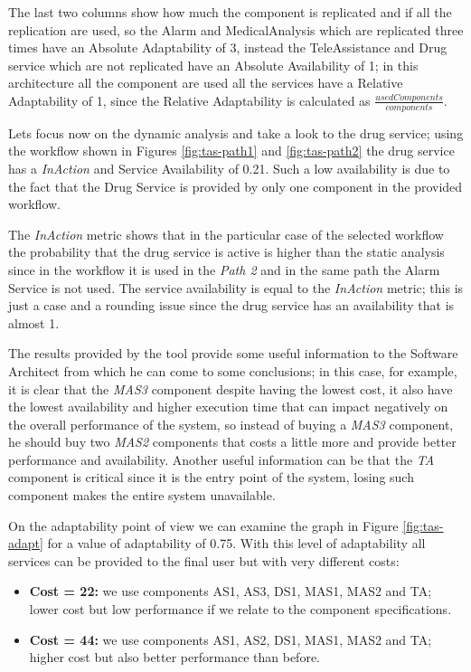 The last two columns show how much the component is replicated and if all the replication are used, so the Alarm and MedicalAnalysis which are replicated three times have an Absolute Adaptability of 3, instead the TeleAssistance and Drug service which are not replicated have an Absolute Availability of 1; in this architecture all the component are used all the services have a Relative Adaptability of 1, since the Relative Adaptability is calculated as $\frac{usedComponents}{components}$.

Lets focus now on the dynamic analysis and take a look to the drug service; using the workflow shown in Figures \ref{fig:tas-path1} and \ref{fig:tas-path2} the drug service has a \emph{InAction} and Service Availability of 0.21. Such a low availability is due to the fact that the Drug Service is provided by only one component in the provided workflow.

The \emph{InAction} metric shows that in the particular case of the selected workflow the probability that the drug service is active is higher than the static analysis since in the workflow it is used in the \emph{Path 2} and in the same path the Alarm Service is not used. The service availability is equal to the \emph{InAction} metric; this is just a case and a rounding issue since the drug service has an availability that is almost 1.

The results provided by the tool provide some useful information to the Software Architect from which he can come to some conclusions; in this case, for example, it is clear that the \emph{MAS3} component despite having the lowest cost, it also have the lowest availability and higher execution time that can impact negatively on the overall performance of the system, so instead of buying a \emph{MAS3} component, he should buy two \emph{MAS2} components that costs a little more and provide better performance and availability. Another useful information can be that the \emph{TA} component is critical since it is the entry point of the system, losing such component makes the entire system unavailable.

On the adaptability point of view we can examine the graph in Figure \ref{fig:tas-adapt} for a value of adaptability of 0.75. With this level of adaptability all services can be provided to the final user but with very different costs:
\begin{itemize}
	\item \textbf{Cost = 22:} we use components AS1, AS3, DS1, MAS1, MAS2 and TA; lower cost but low performance if we relate to the component specifications.
	\item \textbf{Cost = 44:} we use components AS1, AS2, DS1, MAS1, MAS2 and TA; higher cost but also better performance than before.
\end{itemize}


